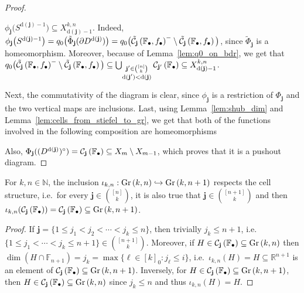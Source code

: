 \begin{proof}
\begin{i_enum}
\item $\phi_{\mathbf{j}}\big(S^{\mathrm{d}(\mathbf{j})-1}\big)\subseteq X_{\mathrm{d}(\mathbf{j})-1}^{k,n}$. Indeed, $\phi_{\mathbf{j}}\big(S^{\mathrm{d}(\mathbf{j})-1}\big)=q_0\big(\tilde{\Phi}_{\mathbf{j}}(\partial D^{\mathrm{d}(\mathbf{j})})\big)=q_0\big(\tilde{\mathcal{C}}_{\mathbf{j}}\left(\mathbb{F}_{\bullet},f_{\bullet}\right)^-\setminus\tilde{\mathcal{C}}_{\mathbf{j}}\left(\mathbb{F}_{\bullet},f_{\bullet}\right)\big)$, since $\tilde{\Phi}_{\mathbf{j}}$ is a homeomorphism. Moreover, because of Lemma~\ref{lem:q0_on_bdr}, we get that $q_0\big(\tilde{\mathcal{C}}_{\mathbf{j}}\left(\mathbb{F}_{\bullet},f_{\bullet}\right)^-\setminus\tilde{\mathcal{C}}_{\mathbf{j}}\left(\mathbb{F}_{\bullet},f_{\bullet}\right)\big)\subseteq\bigcup_{\substack{\mathbf{j}'\in\binom{[n]}{k}\\\mathrm{d}(\mathbf{j}')<\mathrm{d}(\mathbf{j})}}\mathcal{C}_{\mathbf{j'}}\left(\mathbb{F}_{\bullet}\right)\subseteq X_{\mathrm{d}(\mathbf{j})-1}^{k,n}$.
\end{i_enum}
Next, the commutativity of the diagram is clear, since $\phi_{\mathbf{j}}$ is a restriction of $\Phi_{\mathbf{j}}$ and the two vertical maps are inclusions.
Last, using Lemma~\ref{lem:shub_dim} and Lemma~\ref{lem:cells_from_stiefel_to_gr}, we get that both of the functions involved in the following composition are homeomorphisms
\begin{center}
\end{center}
Also, $\Phi_{\mathbf{j}}((D^{\mathrm{d}(\mathbf{j})})^{\circ})=\mathcal{C}_{\mathbf{j}}\left(\mathbb{F}_{\bullet}\right)\subseteq X_m\setminus X_{m-1}$, which proves that it is a pushout diagram.
\end{proof}

\begin{proposition}\label{prop:included_cell} For $k,n\in\mathbb{N}$, the inclusion $\iota_{k,n}:\Gr{k}{n}\hookrightarrow\Gr{k}{n+1}$ respects the cell structure, i.e.\ for every $\mathbf{j}\in\binom{[n]}{k}$, it is also true that $\mathbf{j}\in\binom{[n+1]}{k}$ and then $\iota_{k,n}(\grcell{j})=\grcell{j}\subseteq\Gr{k}{n+1}$.
\end{proposition}
\begin{proof} If $\mathbf{j}=\{1\leq j_1<j_2<\cdots<j_k\leq n\}$, then trivially $j_k\leq n+1$, i.e.\ $\{1\leq j_1<\cdots<j_k\leq n+1\}\in\binom{[n+1]}{k}$. Moreover, if $H\in\grcell{j}\subseteq\Gr{k}{n}$ then $\dim(H\cap\mathbb{F}_{n+1})=j_k=\max\{\ell\in[k]_0:j_{\ell}\leq i\}$, i.e.\ $\iota_{k,n}(H)=H\subseteq\mathbb{R}^{n+1}$ is an element of $\grcell{j}\subseteq\Gr{k}{n+1}$. Inversely, for $H\in\grcell{j}\subseteq\Gr{k}{n+1}$, then $H\in\grcell{j}\subseteq\Gr{k}{n}$ since $j_k\leq n$ and thus $\iota_{k,n}(H)=H$.
\end{proof}

